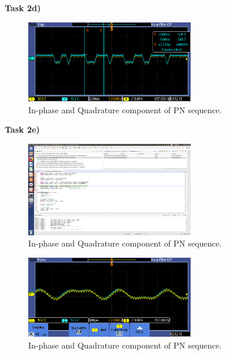 \documentclass{article}
\begin{document}
\pagebreak
\textbf{Task 2d)}

\begin{figure}[h]
  \begin{center}
    \includegraphics[width=0.65\textwidth]{img/task_2_c_oscilloscope.png}
    \caption{In-phase and Quadrature component of PN sequence.}
  \end{center}
\end{figure}

\textbf{Task 2e)}

\begin{figure}[h]
  \begin{center}
    \includegraphics[width=0.65\textwidth]{img/task_2_c_profile.png}
    \caption{In-phase and Quadrature component of PN sequence.}
  \end{center}
\end{figure}

\begin{figure}[h]
  \begin{center}
    \includegraphics[width=0.65\textwidth]{img/task_2_d_delay.png}
    \caption{In-phase and Quadrature component of PN sequence.}
  \end{center}
\end{figure}
\end{document}
